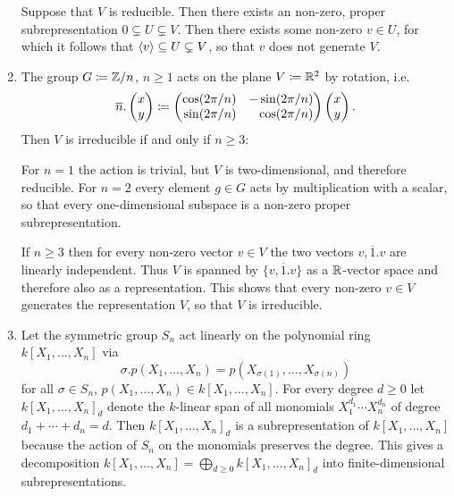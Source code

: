 \begin{example}
\begin{enumerate}
      Suppose that $V$ is reducible.
      Then there exists an non-zero, proper subrepresentation $0 \subsetneq U \subsetneq V$.
      Then there exists some non-zero $v \in U$, for which it follows that $\left\langle v \right\rangle \subseteq U \subsetneq V$, so that $v$ does not generate $V$.
    \item
      The group $G \coloneqq \mathbb{Z}/n$, $n \geq 1$ acts on the plane $V \coloneqq \mathbb{R}^2$ by rotation, i.e.
      \[
                  \overline{n}.\vect{x \\ y}
        \defined  \begin{pmatrix*}[r]
                    \cos(2\pi/n)  & -\sin(2\pi/n) \\
                    \sin(2\pi/n)  &  \cos(2\pi/n)
                  \end{pmatrix*}
                  \vect{x \\ y}.
      \]
      Then $V$ is irreducible if and only if $n \geq 3$:
      
      For $n = 1$ the action is trivial, but $V$ is two-dimensional, and therefore reducible.
      For $n = 2$ every element $g \in G$ acts by multiplication with a scalar, so that every one-dimensional subspace is a non-zero proper subrepresentation.
      
      If $n \geq 3$ then for every non-zero vector $v \in V$ the two vectors $v, \overline{1}.v$ are linearly independent.
      Thus $V$ is spanned by $\{v, \overline{1}.v\}$ as a $\mathbb{R}$-vector space and therefore also as a representation.
      This shows that every non-zero $v \in V$ generates the representation $V$, so that $V$ is irreducible.
    \item
      Let the symmetric group $S_n$ act linearly on the polynomial ring $k[X_1, \dotsc, X_n]$ via
      \[
          \sigma.p(X_1, \dotsc, X_n)
        = p(X_{\sigma(1)}, \dotsc, X_{\sigma(n)})
      \]
      for all $\sigma \in S_n$, $p(X_1, \dotsc, X_n) \in k[X_1, \dotsc, X_n]$.
      For every degree $d \geq 0$ let $k[X_1, \dotsc, X_n]_d$ denote the $k$-linear span of all monomials $X_1^{d_1} \dotsm X_n^{d_n}$ of degree $d_1 + \dotsb + d_n = d$.
      Then $k[X_1, \dotsc, X_n]_d$ is a subrepresentation of $k[X_1, \dotsc, X_n]$ because the action of $S_n$ on the monomials preserves the degree.
      This gives a decomposition $k[X_1, \dotsc, X_n] = \bigoplus_{d \geq 0} k[X_1, \dotsc, X_n]_d$ into finite-dimensional subrepresentations.
  \end{enumerate}
\end{example}


